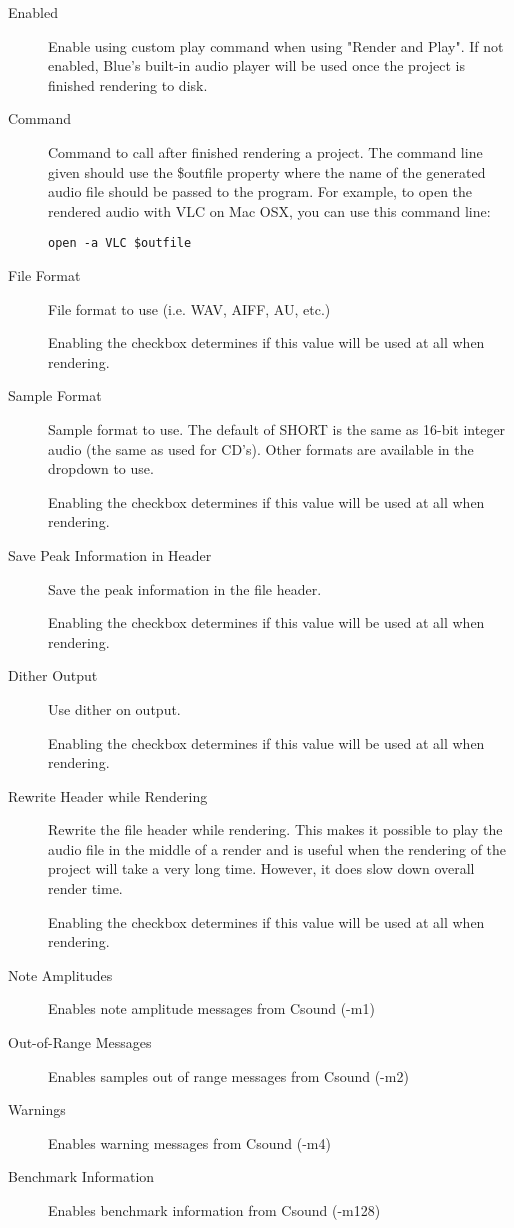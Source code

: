 \begin{description}
\item[Enabled]
Enable using custom play command when using "Render and Play". If not
enabled, Blue's built-in audio player will be used once the project is
finished rendering to disk.
\item[Command]
Command to call after finished rendering a project. The command line
given should use the \$outfile property where the name of the generated
audio file should be passed to the program. For example, to open the
rendered audio with VLC on Mac OSX, you can use this command line:

\begin{verbatim}
open -a VLC $outfile
\end{verbatim}
\end{description}

\begin{description}
\item[File Format]
File format to use (i.e. WAV, AIFF, AU, etc.)

Enabling the checkbox determines if this value will be used at all when
rendering.
\item[Sample Format]
Sample format to use. The default of SHORT is the same as 16-bit integer
audio (the same as used for CD's). Other formats are available in the
dropdown to use.

Enabling the checkbox determines if this value will be used at all when
rendering.
\item[Save Peak Information in Header]
Save the peak information in the file header.

Enabling the checkbox determines if this value will be used at all when
rendering.
\item[Dither Output]
Use dither on output.

Enabling the checkbox determines if this value will be used at all when
rendering.
\item[Rewrite Header while Rendering]
Rewrite the file header while rendering. This makes it possible to play
the audio file in the middle of a render and is useful when the
rendering of the project will take a very long time. However, it does
slow down overall render time.

Enabling the checkbox determines if this value will be used at all when
rendering.
\end{description}

\begin{description}
\item[Note Amplitudes]
Enables note amplitude messages from Csound (-m1)
\item[Out-of-Range Messages]
Enables samples out of range messages from Csound (-m2)
\item[Warnings]
Enables warning messages from Csound (-m4)
\item[Benchmark Information]
Enables benchmark information from Csound (-m128)
\end{description}

